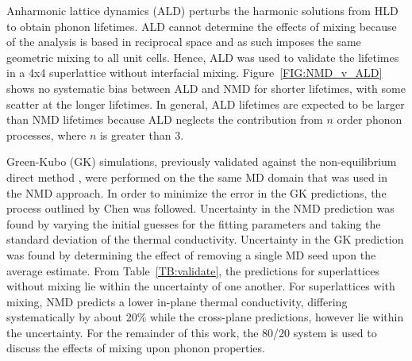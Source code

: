 \documentclass[aps,prb,preprint,preprintnumbers,amsmath,amssymb,floatfix,superscriptaddress]{revtex4}
\begin{document}
Anharmonic lattice dynamics \cite{PhysRevB.79.064301} (ALD) perturbs the harmonic solutions from HLD to obtain phonon lifetimes. ALD cannot determine the effects of mixing because of the analysis is based in reciprocal space and as such imposes the same geometric mixing to all unit cells. Hence, ALD was used to validate the lifetimes in a 4x4 superlattice without interfacial mixing. Figure~\ref{FIG:NMD_v_ALD} shows no systematic bias between ALD and NMD for shorter lifetimes, with some scatter at the longer lifetimes. In general, ALD lifetimes are expected to be larger than NMD lifetimes because ALD neglects the contribution from $n$ order phonon processes, where $n$ is greater than 3. 

Green-Kubo (GK) simulations, previously validated against the non-equilibrium direct method \cite {PhysRevB.79.075316}, were performed on the the same MD domain that was used in the NMD approach. In order to minimize the error in the GK predictions, the process outlined by Chen \cite{Chen20102392} was followed.  Uncertainty in the NMD prediction was found by varying the initial guesses for the fitting parameters and taking the standard deviation of the thermal conductivity. Uncertainty in the GK prediction was found by determining the effect of removing a single MD seed upon the average estimate. From Table~\ref{TB:validate}, the predictions for superlattices without mixing lie within the uncertainty of one another. For superlattices with mixing, NMD predicts a lower in-plane thermal conductivity, differing systematically by about 20\% while the cross-plane predictions, however lie within the uncertainty. For the remainder of this work, the 80/20 system is used to discuss the effects of mixing upon phonon properties.
\end{document}
